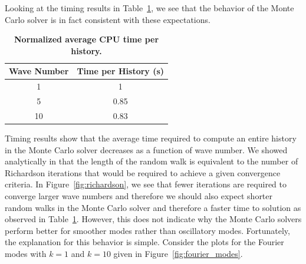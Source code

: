 \documentclass[note]{TechNote}
\begin{document}
Looking at the timing results in Table~\ref{tab:mc_timing}, we see
that the behavior of the Monte Carlo solver is in fact consistent with
these expectations.
\begin{table}[h!]
  \begin{center}
    \begin{tabular}{cc}\hline\hline
      \multicolumn{1}{c}{\textbf{Wave Number}} & 
      \multicolumn{1}{c}{\textbf{Time per History (s)}} \\
      \hline
      1 & 1 \\
      5 & 0.85 \\
      10 & 0.83 \\
      \hline\hline
    \end{tabular}
  \end{center}
  \caption{\textbf{Normalized average CPU time per history.}}
  \label{tab:mc_timing}
\end{table}
Timing results show that the average time required to compute an
entire history in the Monte Carlo solver decreases as a function of
wave number. We showed analytically in \cite{slattery_2013} that the
length of the random walk is equivalent to the number of Richardson
iterations that would be required to achieve a given convergence
criteria. In Figure~\ref{fig:richardson}, we see that fewer iterations
are required to converge larger wave numbers and therefore we should
also expect shorter random walks in the Monte Carlo solver and
therefore a faster time to solution as observed in
Table~\ref{tab:mc_timing}. However, this does not indicate why the
Monte Carlo solvers perform better for smoother modes rather than
oscillatory modes. Fortunately, the explanation for this behavior is
simple. Consider the plots for the Fourier modes with $k = 1$ and $k =
10$ given in Figure~\ref{fig:fourier_modes}.
\end{document}
